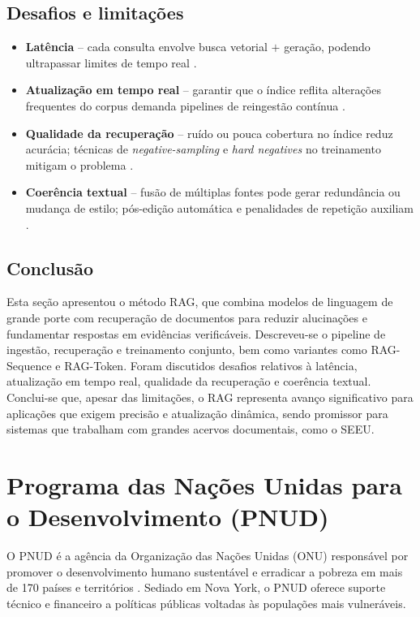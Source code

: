 \begin{description}
\subsection{Desafios e limitações}
\begin{itemize}
  \item \textbf{Latência} – cada consulta envolve busca vetorial $+$ geração,
        podendo ultrapassar limites de tempo real
        \cite{scalable2025overload}.
  \item \textbf{Atualização em tempo real} – garantir que o índice reflita
        alterações frequentes do corpus demanda pipelines de reingestão
        contínua \cite{taipalus2024vector}.
  \item \textbf{Qualidade da recuperação} – ruído ou pouca cobertura no índice
        reduz acurácia; técnicas de \textit{negative-sampling} e \textit{hard
        negatives} no treinamento mitigam o problema
        \cite{gao2023survey,salemi2024hallucination}.
  \item \textbf{Coerência textual} – fusão de múltiplas fontes pode gerar
        redundância ou mudança de estilo; pós-edição automática e
        penalidades de repetição auxiliam \cite{zhang2025fine}.
\end{itemize}

\subsection{Conclusão}
Esta seção apresentou o método RAG, que combina modelos de linguagem de grande porte com recuperação de documentos para reduzir alucinações e fundamentar respostas em evidências verificáveis. Descreveu-se o pipeline de ingestão, recuperação e treinamento conjunto, bem como variantes como RAG-Sequence e RAG-Token. Foram discutidos desafios relativos à latência, atualização em tempo real, qualidade da recuperação e coerência textual. Conclui-se que, apesar das limitações, o RAG representa avanço significativo para aplicações que exigem precisão e atualização dinâmica, sendo promissor para sistemas que trabalham com grandes acervos documentais, como o SEEU.

\section{Programa das Nações Unidas para o Desenvolvimento (PNUD)}
\label{sec:pnud}

O PNUD é a agência da Organização das Nações Unidas (ONU) responsável por promover o desenvolvimento
humano sustentável e erradicar a pobreza em mais de 170 países e territórios
\cite{undp2025sobre,undp2025onu}. Sediado em Nova York, o PNUD oferece suporte
técnico e financeiro a políticas públicas voltadas às populações mais
vulneráveis.


\end{description}
